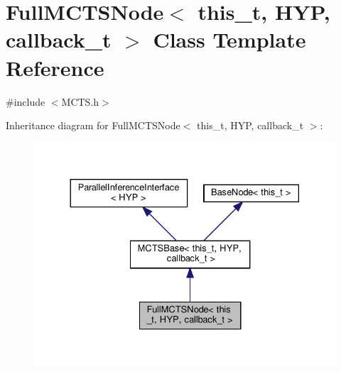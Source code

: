 \hypertarget{class_full_m_c_t_s_node}{}\section{Full\+M\+C\+T\+S\+Node$<$ this\+\_\+t, H\+YP, callback\+\_\+t $>$ Class Template Reference}
\label{class_full_m_c_t_s_node}


{\ttfamily \#include $<$M\+C\+T\+S.\+h$>$}



Inheritance diagram for Full\+M\+C\+T\+S\+Node$<$ this\+\_\+t, H\+YP, callback\+\_\+t $>$\+:
\nopagebreak
\begin{figure}[H]
\begin{center}
\leavevmode
\includegraphics[width=330pt]{class_full_m_c_t_s_node__inherit__graph}
\end{center}
\end{figure}


